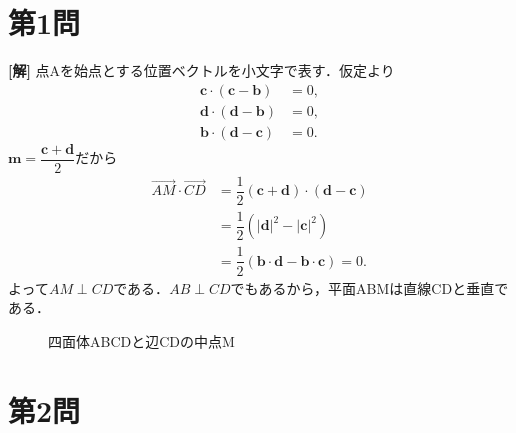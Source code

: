 \documentclass[../main.tex]{subfiles}
\begin{document}
\section*{第1問}

{\bf [解]}
点Aを始点とする位置ベクトルを小文字で表す．仮定より
\begin{align}
  \boldsymbol{c}\cdot(\boldsymbol{c}-\boldsymbol{b})&=0,\\
  \boldsymbol{d}\cdot(\boldsymbol{d}-\boldsymbol{b})&=0,\\
  \boldsymbol{b}\cdot(\boldsymbol{d}-\boldsymbol{c})&=0.
\end{align}
$\boldsymbol{m}=\dfrac{\boldsymbol{c}+\boldsymbol{d}}{2}$だから
\begin{align}
  \overrightarrow{AM}\cdot\overrightarrow{CD}
  &=\dfrac{1}{2}(\boldsymbol{c}+\boldsymbol{d})\cdot(\boldsymbol{d}-\boldsymbol{c})\\
  &=\dfrac{1}{2}(|\boldsymbol{d}|^2-|\boldsymbol{c}|^2)\\
  &=\dfrac{1}{2}(\boldsymbol{b}\cdot\boldsymbol{d}-\boldsymbol{b}\cdot\boldsymbol{c})=0.
\end{align}
よって$AM\perp CD$である．$AB\perp CD$でもあるから，平面ABMは直線CDと垂直である．
\begin{figure}[H]
  \begin{center}
  \end{center}
  \caption{四面体ABCDと辺CDの中点M}
\end{figure}
\newpage

\section*{第2問}
\end{document}
